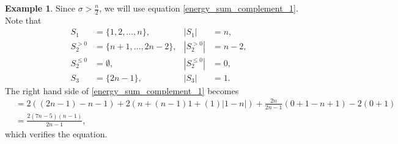 \documentclass[12pt,a4paper,reqno]{amsart}
\numberwithin{equation}{section}
\theoremstyle{plain}
\theoremstyle{definition}
\newtheorem{example}[theorem]{Example}
\newcommand{\<}{\langle}
\renewcommand{\>}{\rangle}
\begin{document}
\begin{example}
        Since $\sigma > \frac{n}{2}$, we will use equation \eqref{energy_sum_complement_1}. Note that 
        \begin{align*}
            S_1 &= \{1,2,\ldots,n\}, & |S_1|&=n, \\
            S_2^{>0} &= \{n+1,\ldots, 2n-2 \}, & |S_2^{>0}|&=n-2, \\
            S_2^{\leq 0} &= \emptyset, & | S_2^{\leq 0}|&=0  , \\
            S_3 &= \{2n-1\}, & |S_3|&=1. 
        \end{align*}
        The right hand side of \eqref{energy_sum_complement_1} becomes 
        \begin{align*}
            &=2((2n-1)-n-1)+2(n+(n-1)1+(1)|1-n|)+\frac{2n}{2n-1} (0+1-n+1)-2(0+1) \\
            &= \frac{2(7n-5)(n-1)}{2n-1},
        \end{align*}
        which verifies the equation.
    \end{example}
    
    







{}



\end{document}
